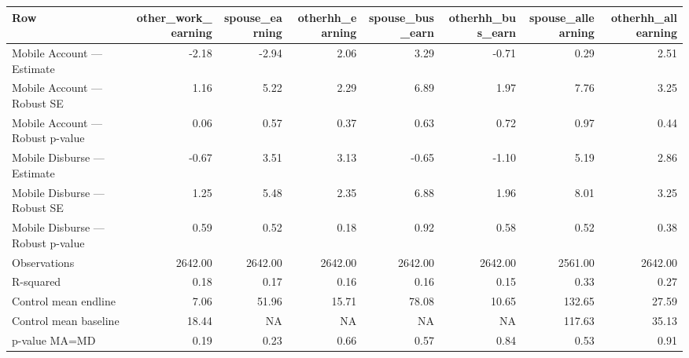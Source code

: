 
\begin{tabular}{lrrrrrrr}
\toprule
Row & other\_work\_earning & spouse\_earning & otherhh\_earning & spouse\_bus\_earn & otherhh\_bus\_earn & spouse\_allearning & otherhh\_allearning\\
\midrule
Mobile Account — Estimate & -2.18 & -2.94 & 2.06 & 3.29 & -0.71 & 0.29 & 2.51\\
Mobile Account — Robust SE & 1.16 & 5.22 & 2.29 & 6.89 & 1.97 & 7.76 & 3.25\\
Mobile Account — Robust p-value & 0.06 & 0.57 & 0.37 & 0.63 & 0.72 & 0.97 & 0.44\\
Mobile Disburse — Estimate & -0.67 & 3.51 & 3.13 & -0.65 & -1.10 & 5.19 & 2.86\\
Mobile Disburse — Robust SE & 1.25 & 5.48 & 2.35 & 6.88 & 1.96 & 8.01 & 3.25\\
\addlinespace
Mobile Disburse — Robust p-value & 0.59 & 0.52 & 0.18 & 0.92 & 0.58 & 0.52 & 0.38\\
Observations & 2642.00 & 2642.00 & 2642.00 & 2642.00 & 2642.00 & 2561.00 & 2642.00\\
R-squared & 0.18 & 0.17 & 0.16 & 0.16 & 0.15 & 0.33 & 0.27\\
Control mean endline & 7.06 & 51.96 & 15.71 & 78.08 & 10.65 & 132.65 & 27.59\\
Control mean baseline & 18.44 & NA & NA & NA & NA & 117.63 & 35.13\\
\addlinespace
p-value MA=MD & 0.19 & 0.23 & 0.66 & 0.57 & 0.84 & 0.53 & 0.91\\
\bottomrule
\end{tabular}
